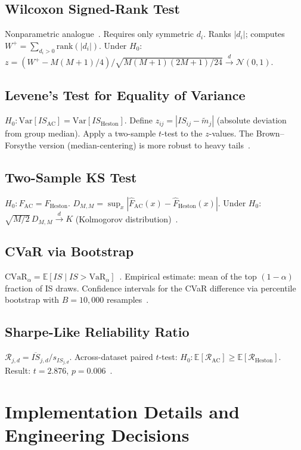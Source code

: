 \documentclass[11pt]{article}
\begin{document}
\subsection{Wilcoxon Signed-Rank Test}
Nonparametric analogue~\cite{lehmann2005testing}. Requires only symmetric $d_i$.
Ranks $|d_i|$; computes $W^+ = \sum_{d_i>0}\text{rank}(|d_i|)$. Under $H_0$:
$z = (W^+ - M(M+1)/4)/\sqrt{M(M+1)(2M+1)/24} \xrightarrow{d} \mathcal{N}(0,1)$.

\subsection{Levene's Test for Equality of Variance}
$H_0\colon \mathrm{Var}[IS_\text{AC}] = \mathrm{Var}[IS_\text{Heston}]$.
Define $z_{ij} = |IS_{ij} - \tilde{m}_j|$ (absolute deviation from group median).
Apply a two-sample $t$-test to the $z$-values. The Brown--Forsythe version
(median-centering) is more robust to heavy tails~\cite{levene1960robust,brown1974robust}.

\subsection{Two-Sample KS Test}
$H_0\colon F_\text{AC} = F_\text{Heston}$.
$D_{M,M} = \sup_x|\hat{F}_\text{AC}(x) - \hat{F}_\text{Heston}(x)|$.
Under $H_0$: $\sqrt{M/2}\,D_{M,M}\xrightarrow{d} K$ (Kolmogorov distribution)~\cite{kolmogorov1933sulla,smirnov1948table}.

\subsection{CVaR via Bootstrap}
$\mathrm{CVaR}_\alpha = \mathbb{E}[IS \mid IS > \mathrm{VaR}_\alpha]$~\cite{rockafellar2000cvar}.
Empirical estimate: mean of the top $(1-\alpha)$ fraction of IS draws.
Confidence intervals for the CVaR difference via percentile bootstrap with $B=10{,}000$
resamples~\cite{efron1993bootstrap}.

\subsection{Sharpe-Like Reliability Ratio}
$\mathcal{R}_{j,d} = \overline{IS}_{j,d}/s_{IS_{j,d}}$.
Across-dataset paired $t$-test: $H_0\colon \mathbb{E}[\mathcal{R}_\text{AC}] \geq \mathbb{E}[\mathcal{R}_\text{Heston}]$.
Result: $t = 2.876$, $p = 0.006$~\cite{lehmann2005testing}.

\section{Implementation Details and Engineering Decisions}
\label{app:implementation}
\end{document}
